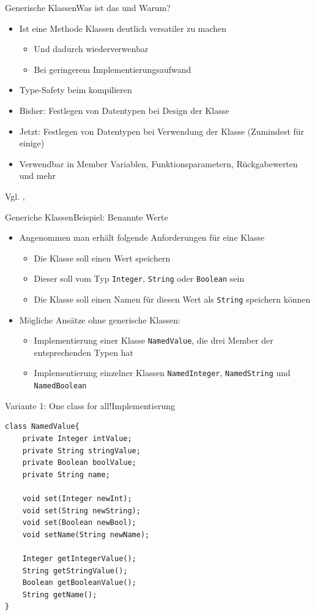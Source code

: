 \begin{frame}{Generische Klassen}{Was ist das und Warum?}
	\begin{itemize}
		\item Ist eine Methode Klassen deutlich versatiler zu machen
		\begin{itemize}
			\item Und dadurch wiederverwenbar
			\item Bei geringerem Implementierungsaufwand
		\end{itemize}
        \item Type-Safety beim kompilieren
		\item Bisher: Festlegen von Datentypen bei Design der Klasse
		\item Jetzt: Festlegen von Datentypen bei Verwendung der Klasse (Zumindest für einige)
		\item Verwendbar in Member Variablen, Funktionsparametern, Rückgabewerten und mehr
	\end{itemize}
Vgl. \cite{orac:geny}, \cite{wiki:generics}
\end{frame}

\begin{frame}{Generiche Klassen}{Beispiel: Benannte Werte}
	\begin{itemize}
		\item Angenommen man erhält folgende Anforderungen für eine Klasse
		\begin{itemize}
			\item Die Klasse soll einen Wert speichern
            \item Dieser soll vom Typ \texttt{Integer}, \texttt{String} oder \texttt{Boolean} sein
			\item Die Klasse soll einen Namen für diesen Wert als \texttt{String} speichern können
		\end{itemize}
		\item Mögliche Ansätze ohne generische Klassen:
		\begin{itemize}
			\item Implementierung einer Klasse \texttt{NamedValue}, die drei Member der entsprechenden Typen hat
			\item Implementierung einzelner Klassen \texttt{NamedInteger}, \texttt{NamedString} und \texttt{NamedBoolean}
		\end{itemize}
	\end{itemize}
\end{frame}

\begin{frame}[fragile]{Variante 1: One class for all!}{Implementierung}
\lstset{style=java}
\begin{lstlisting}
class NamedValue{
    private Integer intValue;
    private String stringValue;
    private Boolean boolValue;
    private String name;

    void set(Integer newInt);
    void set(String newString);
    void set(Boolean newBool);
    void setName(String newName);

    Integer getIntegerValue();
    String getStringValue();
    Boolean getBooleanValue();
    String getName();
}
\end{lstlisting}
\end{frame}

